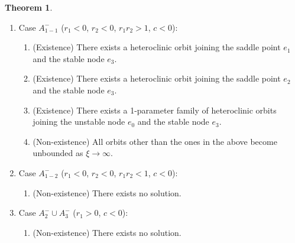 \documentclass{amsart}
\theoremstyle{definition}
\newtheorem{thm1}{Theorem}[section]
\numberwithin{equation}{section}
\begin{document}
\begin{thm1}
\begin{enumerate}
\begin{enumerate}
 \end{enumerate}
 \item Case $A_{1-1}^-$ ($r_1<0$, $r_2<0$, $r_1r_2>1$, $c<0$):
\begin{enumerate}
 \item (Existence) There exists a heteroclinic orbit joining the saddle point $e_1$ and the stable node $e_3$.
 \item (Existence) There exists a heteroclinic orbit joining the saddle point $e_2$ and the stable node $e_3$.
 \item (Existence) There exists a 1-parameter family of heteroclinic orbits joining the unstable node $e_0$ and the stable node $e_3$.
 \item (Non-existence) All orbits other than the ones in the above become unbounded as $\xi \rightarrow \infty$.
\end{enumerate}
 \item Case $A_{1-2}^-$ ($r_1<0$, $r_2<0$, $r_1r_2<1$, $c<0$):
 \begin{enumerate}
  \item (Non-existence) There exists no solution.
 \end{enumerate}
\item Case $A_{2}^- \cup A_3^-$ ($r_1>0$, $c<0$):
 \begin{enumerate}
  \item (Non-existence) There exists no solution.
 \end{enumerate}
\end{enumerate}

% 
%  
\end{thm1}
\end{document}
